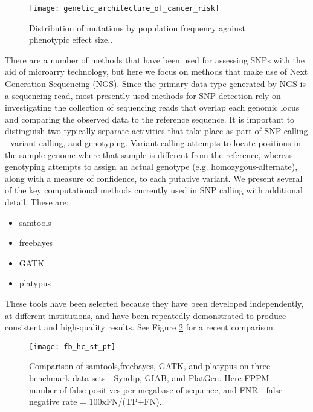 \begin{figure}[H]
    \texttt{[image: genetic\_architecture\_of\_cancer\_risk]}
    \centering
    \caption {Distribution of mutations by population frequency against phenotypic effect size.\autocite{weitzel2011genetics}.}
    \label{fig:genetic_architecture_of_cancer_risk}
\end{figure}

There are a number of methods that have been used for assessing SNPs with the aid of microarry technology\autocite{heller2002dna}, but here we focus on methods that make use of Next Generation Sequencing (NGS). Since the primary data type generated by NGS is a sequencing read, most presently used methods for SNP detection rely on investigating the collection of sequencing reads that overlap each genomic locus and comparing the observed data to the reference sequence. It is important to distinguish two typically separate activities that take place as part of SNP calling - variant calling, and genotyping. Variant calling attempts to locate positions in the sample genome where that sample is different from the reference, whereas genotyping attempts to assign an actual genotype (e.g. homozygous-alternate), along with a measure of confidence, to each putative variant. We present several of the key computational methods currently used in SNP calling with additional detail. These are:

\begin{itemize}
    \item samtools
    \item freebayes
    \item GATK
    \item platypus
\end{itemize}

These tools have been selected because they have been developed independently, at different institutions, and have been repeatedly demonstrated to produce consistent and high-quality results. See Figure \ref{fig:fb_hc_st_pt} for a recent comparison.

\begin{figure}[H]
    \texttt{[image: fb\_hc\_st\_pt]}
    \centering
    \caption {Comparison of samtools,freebayes, GATK, and platypus on three benchmark data sets - Syndip, GIAB, and PlatGen. Here FPPM - number of false positives per megabase of sequence, and FNR - false negative rate = 100xFN/(TP+FN).\autocite{li2018synthetic}.}
    \label{fig:fb_hc_st_pt}
\end{figure}

